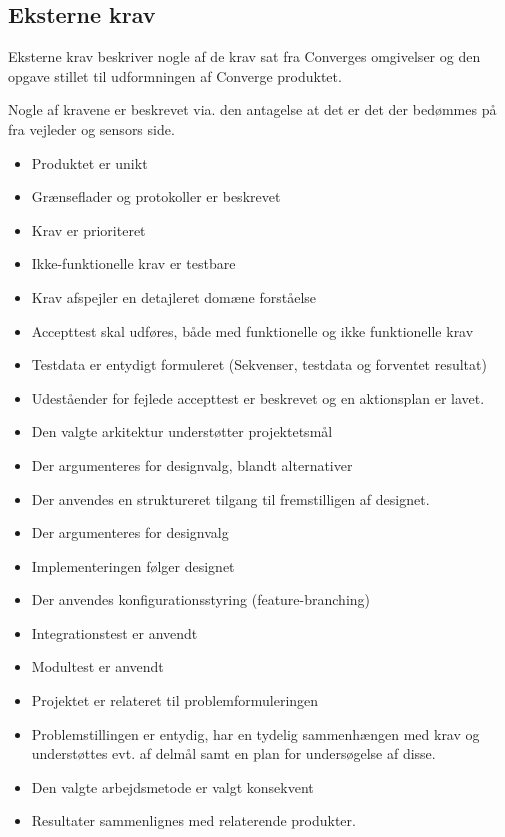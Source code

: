\subsection{Eksterne krav}

Eksterne krav beskriver nogle af de krav sat fra Converges omgivelser og den opgave stillet til udformningen af Converge produktet.

Nogle af kravene er beskrevet via. den antagelse at det er det der bedømmes på fra vejleder og sensors side.


\begin{itemize}
  \item Produktet er unikt
  \item Grænseflader og protokoller er beskrevet
  \item Krav er prioriteret
  \item Ikke-funktionelle krav er testbare
  \item Krav afspejler en detajleret domæne forståelse
  \item Accepttest skal udføres, både med funktionelle og ikke funktionelle krav
  \item Testdata er entydigt formuleret (Sekvenser, testdata og forventet resultat)
  \item Udeståender for fejlede accepttest er beskrevet og en aktionsplan er lavet.
  \item Den valgte arkitektur understøtter projektetsmål
  \item Der argumenteres for designvalg, blandt alternativer
  \item Der anvendes en struktureret tilgang til fremstilligen af designet.
  \item Der argumenteres for designvalg
  \item Implementeringen følger designet
  \item Der anvendes konfigurationsstyring (feature-branching)
  \item Integrationstest er anvendt
  \item Modultest er anvendt
  \item Projektet er relateret til problemformuleringen
  \item Problemstillingen er entydig, har en tydelig sammenhængen med krav og understøttes evt. af delmål samt en plan for undersøgelse af disse.
  \item Den valgte arbejdsmetode er valgt konsekvent
  \item Resultater sammenlignes med relaterende produkter.
\end{itemize}